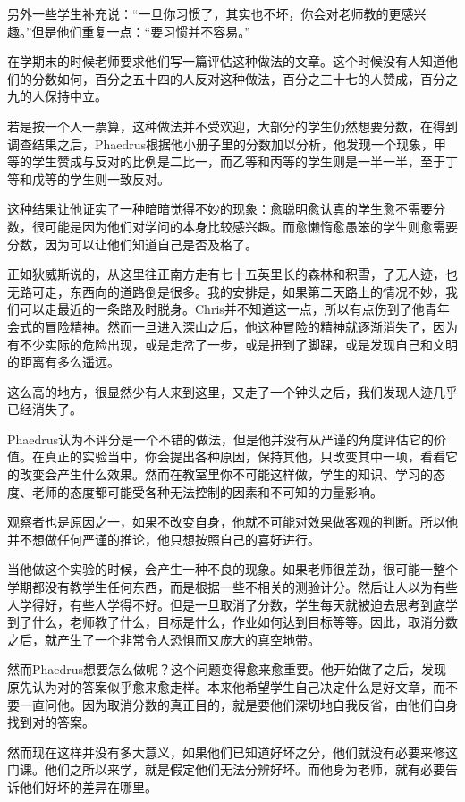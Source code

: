 \documentclass[UTF8]{article}
\begin{document}
\par 另外一些学生补充说：“一旦你习惯了，其实也不坏，你会对老师教的更感兴趣。”但是他们重复一点：“要习惯并不容易。”
\par 在学期末的时候老师要求他们写一篇评估这种做法的文章。这个时候没有人知道他们的分数如何，百分之五十四的人反对这种做法，百分之三十七的人赞成，百分之九的人保持中立。
\par 若是按一个人一票算，这种做法并不受欢迎，大部分的学生仍然想要分数，在得到调查结果之后，Phaedrus根据他小册子里的分数加以分析，他发现一个现象，甲等的学生赞成与反对的比例是二比一，而乙等和丙等的学生则是一半一半，至于丁等和戊等的学生则一致反对。
\par 这种结果让他证实了一种暗暗觉得不妙的现象：愈聪明愈认真的学生愈不需要分数，很可能是因为他们对学问的本身比较感兴趣。而愈懒惰愈愚笨的学生则愈需要分数，因为可以让他们知道自己是否及格了。
\par 正如狄威斯说的，从这里往正南方走有七十五英里长的森林和积雪，了无人迹，也无路可走，东西向的道路倒是很多。我的安排是，如果第二天路上的情况不妙，我们可以走最近的一条路及时脱身。Chris并不知道这一点，所以有点伤到了他青年会式的冒险精神。然而一旦进入深山之后，他这种冒险的精神就逐渐消失了，因为有不少实际的危险出现，或是走岔了一步，或是扭到了脚踝，或是发现自己和文明的距离有多么遥远。
\par 这么高的地方，很显然少有人来到这里，又走了一个钟头之后，我们发现人迹几乎已经消失了。
\par Phaedrus认为不评分是一个不错的做法，但是他并没有从严谨的角度评估它的价值。在真正的实验当中，你会提出各种原因，保持其他，只改变其中一项，看看它的改变会产生什么效果。然而在教室里你不可能这样做，学生的知识、学习的态度、老师的态度都可能受各种无法控制的因素和不可知的力量影响。
\par 观察者也是原因之一，如果不改变自身，他就不可能对效果做客观的判断。所以他并不想做任何严谨的推论，他只想按照自己的喜好进行。
\par 当他做这个实验的时候，会产生一种不良的现象。如果老师很差劲，很可能一整个学期都没有教学生任何东西，而是根据一些不相关的测验计分。然后让人以为有些人学得好，有些人学得不好。但是一旦取消了分数，学生每天就被迫去思考到底学到了什么，老师教了什么，目标是什么，作业如何达到目标等等。因此，取消分数之后，就产生了一个非常令人恐惧而又庞大的真空地带。
\par 然而Phaedrus想要怎么做呢？这个问题变得愈来愈重要。他开始做了之后，发现原先认为对的答案似乎愈来愈走样。本来他希望学生自己决定什么是好文章，而不要一直问他。因为取消分数的真正目的，就是要他们深切地自我反省，由他们自身找到对的答案。
\par 然而现在这样并没有多大意义，如果他们已知道好坏之分，他们就没有必要来修这门课。他们之所以来学，就是假定他们无法分辨好坏。而他身为老师，就有必要告诉他们好坏的差异在哪里。
\end{document}
